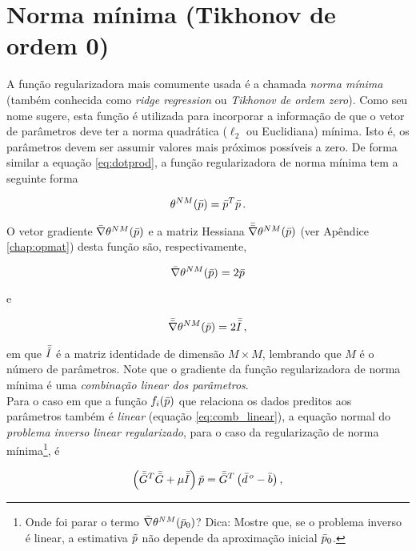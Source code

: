 \section{Norma mínima (Tikhonov de ordem 0)}

A função regularizadora mais comumente usada é a chamada {\it norma mínima}
(também conhecida como {\it ridge regression} ou {\it Tikhonov de ordem zero}).
Como seu nome sugere, esta função é utilizada para incorporar a informação de
que o vetor de parâmetros deve ter a norma quadrática ($\ell_2$ ou Euclidiana)
mínima.
Isto é, os parâmetros devem ser assumir valores mais próximos possíveis a zero.
De forma similar a equação \ref{eq:dotprod}, a função regularizadora de norma
mínima tem a seguinte forma

\begin{equation}
\theta^{NM}(\bar{p}) = \bar{p}^T\bar{p} \thinspace .
\label{eq:norma_minima}
\end{equation}

\indent O vetor gradiente $\bar{\nabla}\theta^{NM}(\bar{p})$ e a matriz Hessiana
$\bar{\bar{\nabla}}\theta^{NM}(\bar{p})$ (ver Apêndice \ref{chap:opmat}) desta função
são, respectivamente,

\begin{equation}
\bar{\nabla}\theta^{NM}(\bar{p}) = 2\bar{p}
\label{eq:grad_norma_minima}
\end{equation}

\noindent e

\begin{equation}
\bar{\bar{\nabla}}\theta^{NM}(\bar{p}) = 2\bar{\bar{I}} \thinspace ,
\label{eq:hessian_norma_minima}
\end{equation}

\noindent em que $\bar{\bar{I}}$ é a matriz identidade de dimensão $M \times M$,
lembrando que $M$ é o número de parâmetros.
Note que o gradiente da função regularizadora de norma mínima é uma
{\it combinação linear dos parâmetros}.
\\
\indent Para o caso em que a função $f_i(\bar{p})$ que relaciona
os dados preditos aos parâmetros também é {\it linear} (equação \ref{eq:comb_linear}),
a equação normal do {\it problema inverso linear regularizado},
para o caso da regularização de norma mínima\footnote{
Onde foi parar o termo $\bar{\nabla}\theta^{NM}(\bar{p}_0)$? Dica: Mostre que, se o
problema inverso é linear, a estimativa $\tilde{p}$ não depende da aproximação
inicial $\bar{p}_0$.}, é

\begin{equation}
\left(\bar{\bar{G}}^T\bar{\bar{G}} + \mu\bar{\bar{I}}\right)\tilde{p} =
    \bar{\bar{G}}^T\left(\bar{d}^{\thinspace o} - \bar{b} \right) ,
\label{eq:sistema_normal_norma_min_linear}
\end{equation}

